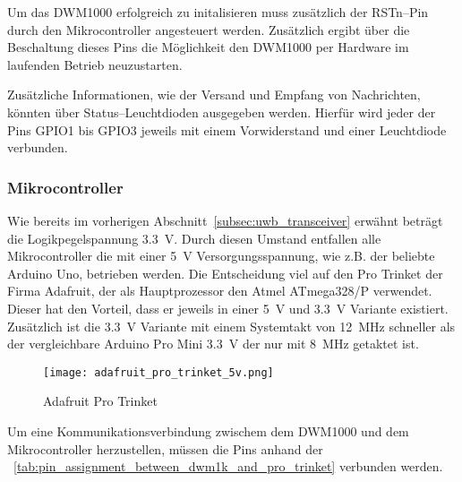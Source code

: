 Um das DWM1000 erfolgreich zu initalisieren muss zusätzlich der RSTn--Pin durch den Mikrocontroller angesteuert werden. Zusätzlich ergibt über die Beschaltung dieses Pins die Möglichkeit den DWM1000 per Hardware im laufenden Betrieb neuzustarten.

Zusätzliche Informationen, wie der Versand und Empfang von Nachrichten, könnten über Status--Leuchtdioden ausgegeben werden. Hierfür wird jeder der Pins GPIO1 bis GPIO3 jeweils mit einem Vorwiderstand und einer Leuchtdiode verbunden.


\begin{comment}
------------------------------------------------------------------------------------------
\end{comment}
\subsubsection{Mikrocontroller}

Wie bereits im vorherigen Abschnitt~\ref{subsec:uwb_transceiver} erwähnt beträgt die Logikpegelspannung \SI{3.3}{\volt}. Durch diesen Umstand entfallen alle Mikrocontroller die mit einer \SI{5}{\volt} Versorgungsspannung, wie z.B. der beliebte Arduino Uno, betrieben werden. Die Entscheidung viel auf den Pro Trinket der Firma Adafruit, der als Hauptprozessor den Atmel ATmega328/P verwendet. Dieser hat den Vorteil, dass er jeweils in einer \SI{5}{\volt} und \SI{3.3}{\volt} Variante existiert. Zusätzlich ist die \SI{3.3}{\volt} Variante mit einem Systemtakt von \SI{12}{\MHz} schneller als der vergleichbare Arduino Pro Mini \SI{3.3}{\volt} der nur mit \SI{8}{\MHz} getaktet ist.

\begin{figure}
	\centering
	\texttt{[image: adafruit\_pro\_trinket\_5v.png]}
	\caption[Adafruit Pro Trinket]{Adafruit Pro Trinket\protect\footnotemark}
	\label{fig:adafruit_pro_trinket}
\end{figure}


Um eine Kommunikationsverbindung zwischem dem DWM1000 und dem Mikrocontroller herzustellen, müssen die Pins anhand der \tablename~\ref{tab:pin_assignment_between_dwm1k_and_pro_trinket} verbunden werden.


